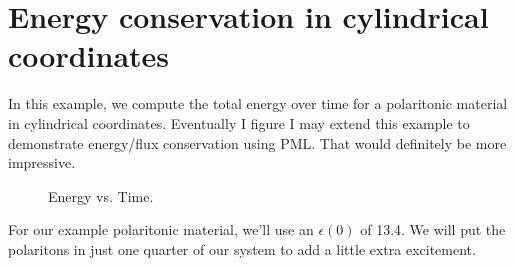 \begin{comment}
#include <stdio.h>
#include <stdlib.h>
#include <signal.h>
\end{comment}

\section{Energy conservation in cylindrical coordinates}

In this example, we compute the total energy over time for a polaritonic
material in cylindrical coordinates.  Eventually I figure I may extend this
example to demonstrate energy/flux conservation using PML.  That would
definitely be more impressive.

\begin{figure}
\label{econs_1d}
\caption{Energy vs. Time.}
\end{figure}

\begin{comment}
#include "dactyl.h"

const double a = 10;
\end{comment}

For our example polaritonic material, we'll use an $\epsilon(0)$ of 13.4.
We will put the polaritons in just one quarter of our system to add a
little extra excitement.

